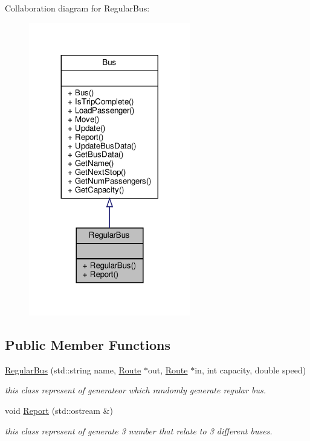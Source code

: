 Collaboration diagram for Regular\+Bus\+:\nopagebreak
\begin{figure}[H]
\begin{center}
\leavevmode
\includegraphics[width=200pt]{classRegularBus__coll__graph}
\end{center}
\end{figure}
\subsection*{Public Member Functions}
\begin{DoxyCompactItemize}
\item 
\hyperlink{classRegularBus_ac97f3951dee6538eb86d36ea0457947e}{Regular\+Bus} (std\+::string name, \hyperlink{classRoute}{Route} $\ast$out, \hyperlink{classRoute}{Route} $\ast$in, int capacity, double speed)
\begin{DoxyCompactList}\small\item\em this class represent of generateor which randomly generate regular bus. \end{DoxyCompactList}\item 
void \hyperlink{classRegularBus_a6ff6c67f22040ab2c9ad23649c3ba9dc}{Report} (std\+::ostream \&)
\begin{DoxyCompactList}\small\item\em this class represent of generate 3 number that relate to 3 different buses. \end{DoxyCompactList}\end{DoxyCompactItemize}


